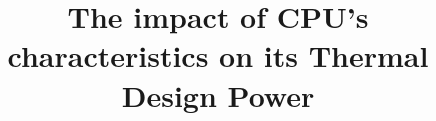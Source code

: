 \documentclass{hcmut-report}
\title{The impact of CPU's characteristics on its Thermal Design Power}
\begin{document}
\coverpage%

\newpage
\tableofcontents
\newpage

% 
% 
% 

%
%
%
%










\end{document}
